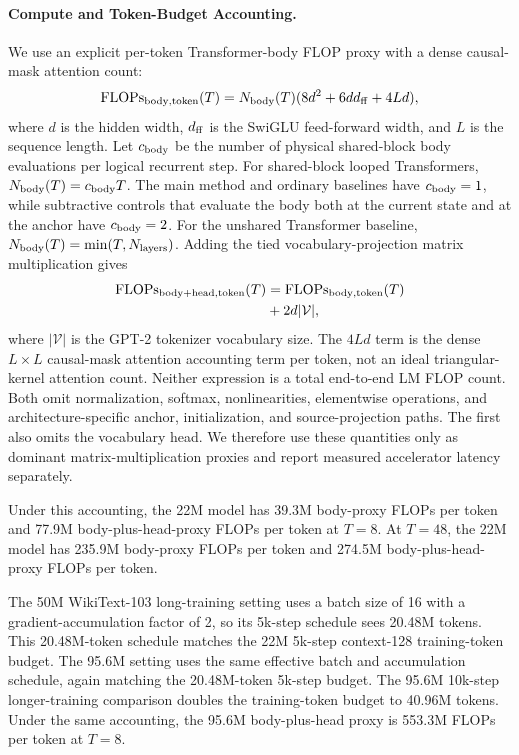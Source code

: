 \documentclass[letterpaper]{article} %
\theoremstyle{remark}
\begin{document}
\paragraph{Compute and Token-Budget Accounting.} We use an explicit per-token Transformer-body FLOP proxy with a dense causal-mask attention count:
\begin{equation}
	\mathrm{FLOPs}_{\rm body,token}(T)
	=
	N_{\rm body}(T)(8d^2+6dd_{\rm ff}+4Ld),
\end{equation}
where $d$ is the hidden width, $d_{\rm ff}$ is the SwiGLU feed-forward width, and $L$ is the sequence length.  Let $c_{\rm body}$ be the number of physical shared-block body evaluations per logical recurrent step.  For shared-block looped Transformers, $N_{\rm body}(T)=c_{\rm body}T$.  The main method and ordinary baselines have $c_{\rm body}=1$, while subtractive controls that evaluate the body both at the current state and at the anchor have $c_{\rm body}=2$.  For the unshared Transformer baseline, $N_{\rm body}(T)=\min(T,N_{\rm layers})$.  Adding the tied vocabulary-projection matrix multiplication gives
\begin{equation}
	\begin{aligned}
		\mathrm{FLOPs}_{\rm body+head,token}(T)
		 & =\mathrm{FLOPs}_{\rm body,token}(T) \\
		 & +2d|\mathcal V|,
	\end{aligned}
\end{equation}
where $|\mathcal V|$ is the GPT-2 tokenizer vocabulary size.  The $4Ld$ term is the dense $L\times L$ causal-mask attention accounting term per token, not an ideal triangular-kernel attention count.  Neither expression is a total end-to-end LM FLOP count.  Both omit normalization, softmax, nonlinearities, elementwise operations, and architecture-specific anchor, initialization, and source-projection paths.  The first also omits the vocabulary head.  We therefore use these quantities only as dominant matrix-multiplication proxies and report measured accelerator latency separately.

Under this accounting, the 22M model has 39.3M body-proxy FLOPs per token and 77.9M body-plus-head-proxy FLOPs per token at $T=8$.  At $T=48$, the 22M model has 235.9M body-proxy FLOPs per token and 274.5M body-plus-head-proxy FLOPs per token.

The 50M WikiText-103 long-training setting uses a batch size of 16 with a gradient-accumulation factor of 2, so its 5k-step schedule sees 20.48M tokens.  This 20.48M-token schedule matches the 22M 5k-step context-128 training-token budget.  The 95.6M setting uses the same effective batch and accumulation schedule, again matching the 20.48M-token 5k-step budget.  The 95.6M 10k-step longer-training comparison doubles the training-token budget to 40.96M tokens.  Under the same accounting, the 95.6M body-plus-head proxy is 553.3M FLOPs per token at $T=8$.
\end{document}
